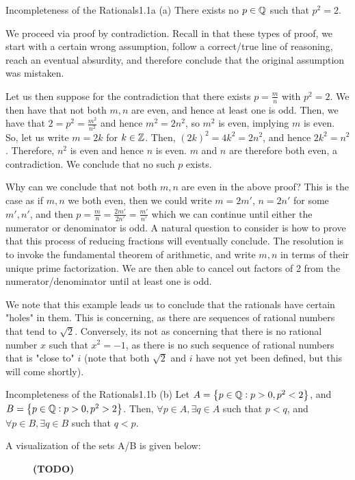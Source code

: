 \begin{example}{Incompleteness of the Rationals}{1.1a}
    (a) There exists no $p \in \QQ$ such that $p^2 = 2$.
\end{example}
We proceed via proof by contradiction. Recall in that these types of proof, we start with a certain wrong assumption, follow a correct/true line of reasoning, reach an eventual absurdity, and therefore conclude that the original assumption was mistaken. 
\begin{nproof}
    Let us then suppose for the contradiction that there exists $p = \frac{m}{n}$ with $p^2 = 2$. We then have that not both $m, n$ are even, and hence at least one is odd. Then, we have that $2 = p^2 = \frac{m^2}{n^2}$ and hence $m^2 = 2n^2$, so $m^2$ is even, implying $m$ is even. So, let us write $m = 2k$ for $k \in \ZZ$. Then, $(2k)^2 = 4k^2 = 2n^2$, and hence $2k^2 = n^2$. Therefore, $n^2$ is even and hence $n$ is even. $m$ and $n$ are therefore both even, a contradiction. We conclude that no such $p$ exists.
\end{nproof}
Why can we conclude that not both $m, n$ are even in the above proof? This is the case as if $m, n$ we both even, then we could write $m = 2m'$, $n = 2n'$ for some $m', n'$, and then $p = \frac{m}{n} = \frac{2m'}{2n'} = \frac{m'}{n'}$ which we can continue until either the numerator or denominator is odd. A natural question to consider is how to prove that this process of reducing fractions will eventually conclude. The resolution is to invoke the fundamental theorem of arithmetic, and write $m, n$ in terms of their unique prime factorization. We are then able to cancel out factors of 2 from the numerator/denominator until at least one is odd.

We note that this example leads us to conclude that the rationals have certain "holes" in them. This is concerning, as there are sequences of rational numbers that tend to $\sqrt{2}$. Conversely, its not as concerning that there is no rational number $x$ such that $x^2 = -1$, as there is no such sequence of rational numbers that is "close to" $i$ (note that both $\sqrt{2}$ and $i$ have not yet been defined, but this will come shortly).

\setcounter{rudin}{0}

\begin{example}{Incompleteness of the Rationals}{1.1b}
    (b) Let $A = \set{p \in \QQ: p > 0, p^2 < 2}$, and $B = \set{p \in \QQ: p > 0, p^2 > 2}$. Then, $\forall p \in A, \exists q \in A$ such that $p < q$, and $\forall p \in B, \exists q \in B$ such that $q < p$. 
\end{example}
A visualization of the sets A/B is given below:
\begin{figure}[h!]
    \begin{tikzpicture}

    \end{tikzpicture}
    \caption{\textbf{(TODO)}}
\end{figure}

